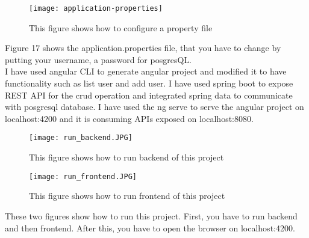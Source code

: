 \documentclass{scrartcl}
\begin{document}


 \begin{figure}[H]
\centering
\texttt{[image: application-properties]}
\caption{This figure shows how to configure a property file}
\label{blabla}
\end{figure}
 
 Figure 17 shows the application.properties file, that you have to change by putting your username, a password for posgresQL.\\
 
I have used angular CLI to generate angular project and modified it to have functionality such as list user and add user. I have used spring boot to expose REST API for the crud operation and integrated spring data to communicate with posgresql database. I have used the ng serve to serve the angular project on localhost:4200 and it is consuming APIs exposed on localhost:8080. 


\begin{figure}[H]
\centering
\texttt{[image: run\_backend.JPG]}
\caption{This figure shows how to run backend of this project}
\label{blabla}
\end{figure}

\begin{figure}[H]
\centering
\texttt{[image: run\_frontend.JPG]}
\caption{This figure shows how to run frontend of this project}
\label{blabla}
\end{figure}

These two figures show how to run this project. First, you have to run backend and then frontend. After this, you have to open the browser on localhost:4200.
\end{document}
